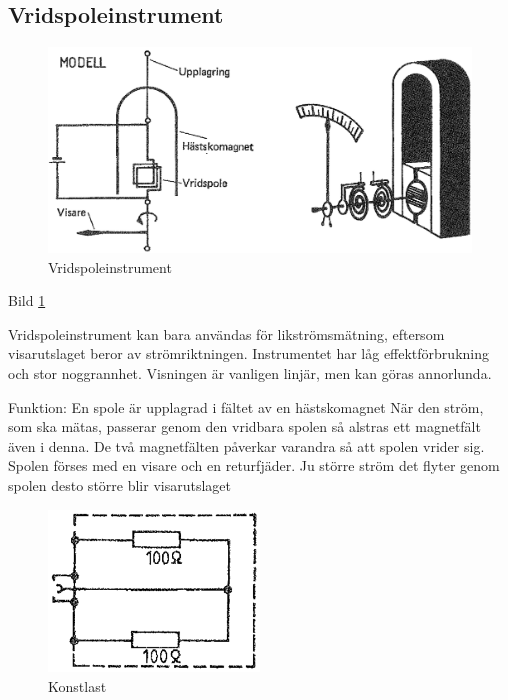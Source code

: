 \subsection{Vridspoleinstrument}

\begin{figure}
  \includegraphics[width=\textwidth]{images/cropped_pdfs/bild_2_8-03.pdf}
  \caption{Vridspoleinstrument}
  \label{fig:bildII8-3}
\end{figure}

Bild \ref{fig:bildII8-3}

Vridspoleinstrument kan bara användas för likströmsmätning, eftersom
visarutslaget beror av strömriktningen.
Instrumentet har låg effektförbrukning och stor noggrannhet.
Visningen är vanligen linjär, men kan göras annorlunda.

Funktion: En spole är upplagrad i fältet av en hästskomagnet När den
ström, som ska mätas, passerar genom den vridbara spolen så alstras
ett magnetfält även i denna. De två magnetfälten påverkar varandra så
att spolen vrider sig. Spolen förses med en visare och en
returfjäder. Ju större ström det flyter genom spolen desto större blir
visarutslaget

\begin{figure}
  \includegraphics[width=0.5\textwidth]{images/cropped_pdfs/bild_2_8-05.pdf}
  \caption{Konstlast}
  \label{fig:bildII8-5}
\end{figure}

